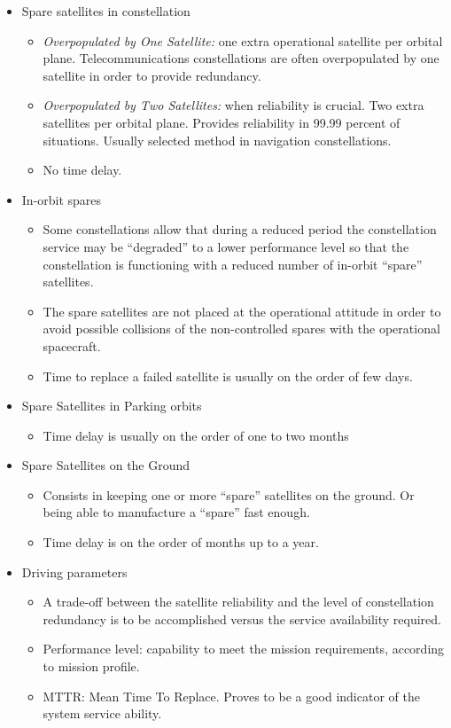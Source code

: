 \documentclass{article}
\begin{document}
\begin{itemize}

\item Spare satellites in constellation
    \begin{itemize}
    \item \emph{Overpopulated by One Satellite:} one extra operational satellite per orbital plane. Telecommunications constellations are often overpopulated by one satellite in order to provide redundancy.
    \item \emph{Overpopulated by Two Satellites:} when reliability is crucial. Two extra satellites per orbital plane. Provides reliability in 99.99 percent of situations. Usually selected method in navigation constellations.
    \item  No time delay.
    \end{itemize}
\item In-orbit spares
    \begin{itemize}
    \item Some constellations allow that during a reduced period the constellation service may be “degraded” to a lower performance level so that the constellation is functioning with a reduced number of in-orbit “spare” satellites.
    \item The spare satellites are not placed at the operational attitude in order to avoid possible collisions of the non-controlled spares with the operational spacecraft.
    \item Time to replace a failed satellite is usually on the order of few days.
    \end{itemize}
\item Spare Satellites in Parking orbits
    \begin{itemize}
    \item Time delay is usually on the order of one to two months
    \end{itemize} 
\item Spare Satellites on the Ground
    \begin{itemize}
    \item Consists in keeping one or more “spare” satellites on the ground. Or being able to manufacture a “spare” fast enough.
    \item Time delay is on the order of months up to a year.
    \end{itemize}
\item Driving parameters
	\begin{itemize}
    \item A trade-off between the satellite reliability and the level of constellation redundancy is to be accomplished versus the service availability required.
    \item Performance level: capability to meet the mission requirements, according to mission profile.
    \item MTTR: Mean Time To Replace. Proves to be a good indicator of the system service ability.
	\end{itemize}
\end{itemize}
\end{document}
